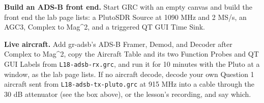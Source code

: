 \documentclass{exam}
\makeatletter
\def\keysol#1{\ifcsname keysol@#1\endcsname\csname keysol@#1\endcsname\fi}
\makeatother
\begin{document}
\begin{questions}
\question \textbf{Build an ADS-B front end.} Start GRC with an empty canvas and build the
front end the lab page lists: a PlutoSDR Source at 1090 MHz and 2 MS/s, an AGC3, Complex
to Mag\^{}2, and a triggered QT GUI Time Sink.


\newpage
\question \textbf{Live aircraft.} Add gr-adsb's ADS-B Framer, Demod, and Decoder after
Complex to Mag\^{}2, copy the Aircraft Table and its two Function Probes and QT GUI Labels from
\texttt{L18-adsb-rx.grc}, and run it for 10 minutes with the Pluto at a window, as the lab
page lists. If no aircraft decode, decode your own Question 1 aircraft sent from
\texttt{L18-adsb-tx-pluto.grc} at 915 MHz into a cable through the 30 dB attenuator (see
the box above), or the lesson's recording, and say which.

\end{questions}
\end{document}
